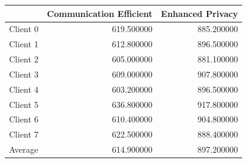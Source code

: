 \begin{tabular}{lrr}
\toprule
 & Communication Efficient & Enhanced Privacy \\
\midrule
Client 0 & 619.500000 & 885.200000 \\
Client 1 & 612.800000 & 896.500000 \\
Client 2 & 605.000000 & 881.100000 \\
Client 3 & 609.000000 & 907.800000 \\
Client 4 & 603.200000 & 896.500000 \\
Client 5 & 636.800000 & 917.800000 \\
Client 6 & 610.400000 & 904.800000 \\
Client 7 & 622.500000 & 888.400000 \\
Average & 614.900000 & 897.200000 \\
\bottomrule
\end{tabular}
